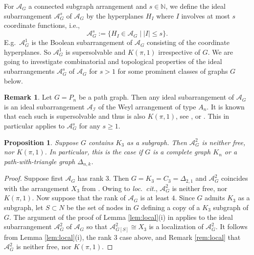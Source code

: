 \documentclass[12pt]{amsart}
\newcommand\CA{{\mathscr A}}
\newcommand\CI{{\mathcal I}}
\newcommand\BBN{{\mathbb N}}
\numberwithin{equation}{section}
\theoremstyle{plain}
\newtheorem{prop}[equation]{Proposition}
\theoremstyle{definition}
\newtheorem{remark}[equation]{Remark}
\begin{document}
For $\CA_G$ a connected subgraph arrangement and $s \in \BBN$, we define the ideal subarrangement
 $\CA_G^s$ of $\CA_G$ by the hyperplanes $H_I$ where $I$ involves at most $s$ coordinate functions, i.e.,  
\begin{equation}
    \label{eq:AGs}
    \CA_G^s := \{H_I \in \CA_G \mid |{I}| \le s \}.
\end{equation}
E.g.~$\CA_G^1$ is the Boolean subarrangement of $\CA_G$ consisting of the coordinate hyperplanes. %
So $\CA_G^1$ is supersolvable and $K(\pi,1)$ irrespective of $G$. We are going to investigate combinatorial and topological properties of the ideal subarrangements $\CA_G^s$ of $\CA_G$ for $s > 1$ for some prominent classes of graphs $G$ below.

\begin{remark}
    \label{rem:Pn}
    Let $G = P_n$ be a path graph. Then any ideal subarrangement of $\CA_G$ is an ideal subarrangement $\CA_\CI$ of the Weyl arrangement of type $A_n$. It is known that each such is supersolvable and thus is also $K(\pi,1)$, see \cite[\S 6]{hultman:koszul}, or 
    \cite[Thm.~1.5]{roehrle:ideal}. This in particular applies to $\CA_G^s$ for any $s \ge 1$.
\end{remark}

\begin{prop}
    \label{prop:AG2notkpi1}
    Suppose $G$ contains $K_3$ as a subgraph. Then $\CA_G^2$ is neither free, nor $K(\pi,1)$. 
    In particular, this is the case if $G$ is a complete graph $K_n$ or a path-with-triangle graph $\Delta_{n,k}$. 
\end{prop}

\begin{proof}
Suppose first $\CA_G$ has rank $3$. Then $G = K_3 = C_3 = \Delta_{2,1}$ and $\CA_G^2$ coincides with the arrangement $X_3$ from \cite[(3.12)]{falkrandell:homotopy}. Owing to \emph{loc.~cit.}, $\CA_G^2$ is neither free, nor $K(\pi,1)$. Now suppose that the rank of $\CA_G$ is at least $4$. 
Since $G$ admits $K_3$ as a subgraph, let $S \subset N$ be the set of nodes in $G$ defining a copy of a $K_3$ subgraph of $G$. The argument of the proof of Lemma \ref{lem:local}(i) in \cite[Lem.~6.2]{cuntzkuehne:subgraphs} applies to the ideal subarrangement $\CA_G^2$ of $\CA_G$ so that $\CA_{G[S]}^2\cong X_3$ is a localization of $\CA_G^2$.
It follows from Lemma \ref{lem:local}(i), the rank $3$ case above, \cite[Thm.~4.37]{orlikterao:arrangements} and Remark \ref{rem:local} that $\CA_G^2$ is neither free, nor $K(\pi,1)$. 
\end{proof}
\end{document}
